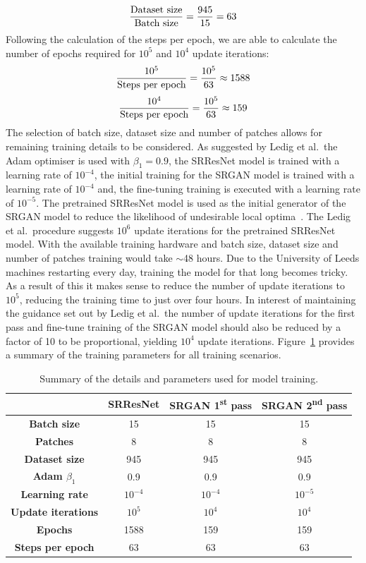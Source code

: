 \[\frac{\textnormal{Dataset size}}{\textnormal{Batch size}} = \frac{945}{15} = 63\]
Following the calculation of the steps per epoch, we are able to calculate the number of epochs required for $10^5$ and $10^4$ update iterations:
\[\frac{10^5}{\textnormal{Steps per epoch}} = \frac{10^5}{63} \approx 1588\]
\[\frac{10^4}{\textnormal{Steps per epoch}} = \frac{10^5}{63} \approx 159\]
The selection of batch size, dataset size and number of patches allows for remaining training details to be considered. As suggested by Ledig et al.\ the Adam optimiser is used with $\beta_1 = 0.9$, the SRResNet model is trained with a learning rate of $10^{-4}$, the initial training for the SRGAN model is trained with a learning rate of $10^{-4}$ and, the fine-tuning training is executed with a learning rate of $10^{-5}$. The pretrained SRResNet model is used as the initial generator of the SRGAN model to reduce the likelihood of undesirable local optima~\cite{srgan}. The Ledig et al.\ procedure suggests $10^6$ update iterations for the pretrained SRResNet model. With the available training hardware and batch size, dataset size and number of patches training would take $\sim$48 hours. Due to the University of Leeds machines restarting every day, training the model for that long becomes tricky. As a result of this it makes sense to reduce the number of update iterations to $10^{5}$, reducing the training time to just over four hours. In interest of maintaining the guidance set out by Ledig et al.\ the number of update iterations for the first pass and fine-tune training of the SRGAN model should also be reduced by a factor of 10 to be proportional, yielding $10^4$ update iterations. Figure~\ref{table:model_training} provides a summary of the training parameters for all training scenarios.
\begin{table}
    \centering
    \begin{tabular}{cccc}
        \toprule
        {} & \textbf{SRResNet} & \textbf{SRGAN 1\textsuperscript{st} pass} & \textbf{SRGAN 2\textsuperscript{nd} pass} \\
        \midrule
        \textbf{Batch size} & 15 & 15 & 15\\ 
        \textbf{Patches} & 8 & 8 & 8 \\
        \textbf{Dataset size} & 945 & 945 & 945\\
        \textbf{Adam $\beta_1$} & 0.9 & 0.9 & 0.9\\
        \textbf{Learning rate} & $10^{-4}$ & $10^{-4}$ & $10^{-5}$ \\
        \textbf{Update iterations} & $10^5$ & $10^4$ & $10^4$ \\
        \textbf{Epochs} & 1588 & 159 & 159 \\
        \textbf{Steps per epoch} & 63 & 63 & 63 \\
        \bottomrule
    \end{tabular}
    \caption{Summary of the details and parameters used for model training.}
    \label{table:model_training}
\end{table}

